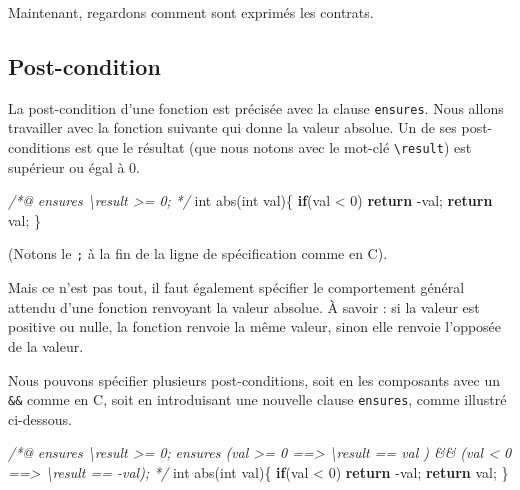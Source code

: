 \documentclass[12pt,francais,]{scrbook}
\newenvironment{Shaded}{}{}
\newcommand{\KeywordTok}[1]{\textcolor[rgb]{0.00,0.44,0.13}{\textbf{{#1}}}}
\newcommand{\DataTypeTok}[1]{\textcolor[rgb]{0.56,0.13,0.00}{{#1}}}
\newcommand{\DecValTok}[1]{\textcolor[rgb]{0.25,0.63,0.44}{{#1}}}
\newcommand{\CommentTok}[1]{\textcolor[rgb]{0.38,0.63,0.69}{\textit{{#1}}}}
\newcommand{\NormalTok}[1]{{#1}}
\begin{document}
Maintenant, regardons comment sont exprimés les contrats.

\subsection{Post-condition}\label{post-condition}

La post-condition d'une fonction est précisée avec la clause
\texttt{ensures}. Nous allons travailler avec la fonction suivante qui
donne la valeur absolue. Un de ses post-conditions est que le résultat
(que nous notons avec le mot-clé \texttt{\textbackslash{}result}) est
supérieur ou égal à 0.

\begin{footnotesize}\begin{Shaded}
\begin{Highlighting}[]
\CommentTok{/*@}
\CommentTok{  ensures \textbackslash{}result >= 0;}
\CommentTok{*/}
\DataTypeTok{int} \NormalTok{abs(}\DataTypeTok{int} \NormalTok{val)\{}
  \KeywordTok{if}\NormalTok{(val < }\DecValTok{0}\NormalTok{) }\KeywordTok{return} \NormalTok{-val;}
  \KeywordTok{return} \NormalTok{val;}
\NormalTok{\}}
\end{Highlighting}
\end{Shaded}\end{footnotesize}

(Notons le \texttt{;} à la fin de la ligne de spécification comme en C).

Mais ce n'est pas tout, il faut également spécifier le comportement
général attendu d'une fonction renvoyant la valeur absolue. À savoir :
si la valeur est positive ou nulle, la fonction renvoie la même valeur,
sinon elle renvoie l'opposée de la valeur.

Nous pouvons spécifier plusieurs post-conditions, soit en les composants
avec un \texttt{\&\&} comme en C, soit en introduisant une nouvelle
clause \texttt{ensures}, comme illustré ci-dessous.

\begin{footnotesize}\begin{Shaded}
\begin{Highlighting}[]
\CommentTok{/*@}
\CommentTok{  ensures \textbackslash{}result >= 0;}
\CommentTok{  ensures (val >= 0 ==> \textbackslash{}result == val ) && }
\CommentTok{          (val <  0 ==> \textbackslash{}result == -val);}
\CommentTok{*/}
\DataTypeTok{int} \NormalTok{abs(}\DataTypeTok{int} \NormalTok{val)\{}
  \KeywordTok{if}\NormalTok{(val < }\DecValTok{0}\NormalTok{) }\KeywordTok{return} \NormalTok{-val;}
  \KeywordTok{return} \NormalTok{val;}
\NormalTok{\}}
\end{Highlighting}
\end{Shaded}\end{footnotesize}
\end{document}
